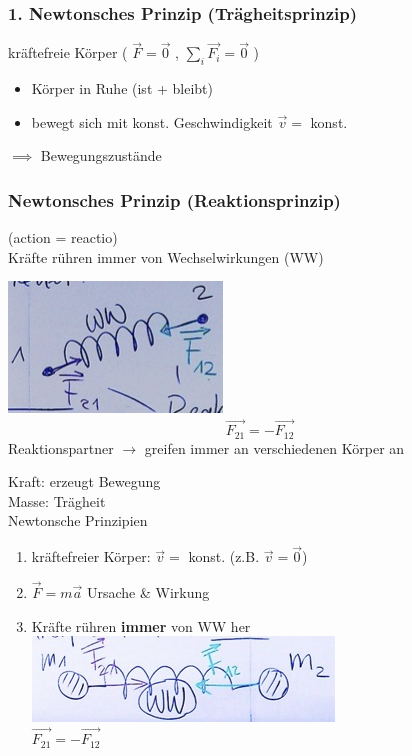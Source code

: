 \subsubsection{1. Newtonsches Prinzip (Trägheitsprinzip)}
kräftefreie Körper ( $\vec{F} = \vec{0}$ , $\sum_i \vec{F_i} = \vec{0}$ )
\begin{itemize}[ label = $\rightarrow$ ]
	\item Körper in Ruhe (ist + bleibt)
	\item bewegt sich mit konst. Geschwindigkeit $\vec{v} =$ konst.
\end{itemize}
$\implies$ Bewegungszustände

\subsubsection{Newtonsches Prinzip (Reaktionsprinzip)}
(action = reactio) \\
Kräfte rühren immer von Wechselwirkungen (WW)
\begin{bsp*}[note = Feder]
	\includegraphics{Bild20}
	\[ \vec{F_{21}} = -\vec{F_{12}} \]
	Reaktionspartner $\rightarrow$ greifen immer an verschiedenen Körper an
\end{bsp*}
\begin{rep*}[ note = Dynamik ]
	Kraft: erzeugt Bewegung \\
	Masse: Trägheit \\
	Newtonsche Prinzipien \\
	\begin{enumerate}
		\item kräftefreier Körper: $\vec{v} =$ konst. (z.B. $\vec{v} = \vec{0}$)
		\item $\vec{F} = m \vec{a}$ Ursache \& Wirkung
		\item Kräfte rühren \textbf{immer} von WW her \\
			\includegraphics{Bild21} \\
			$\vec{F_{21}} = -\vec{F_12}$
	\end{enumerate}
\end{rep*}
